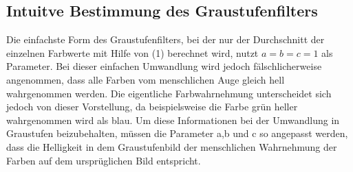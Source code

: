 \documentclass[course=erap]{aspdoc}
\begin{document}
\subsection{Intuitve Bestimmung des Graustufenfilters}
Die einfachste Form des Graustufenfilters, bei der nur der Durchschnitt der einzelnen Farbwerte mit Hilfe von (1) berechnet wird, nutzt $a=b=c=1$ als Parameter. Bei dieser einfachen Umwandlung wird jedoch fälschlicherweise angenommen, dass alle Farben vom menschlichen Auge gleich hell wahrgenommen werden. Die eigentliche Farbwahrnehmung unterscheidet sich jedoch von dieser Vorstellung, da beispielsweise die Farbe grün heller wahrgenommen wird als blau. Um diese Informationen bei der Umwandlung in Graustufen beizubehalten, müssen die Parameter a,b und c so angepasst werden, dass die Helligkeit in dem Graustufenbild der menschlichen Wahrnehmung der Farben auf dem ursprüglichen Bild entspricht.
\end{document}
